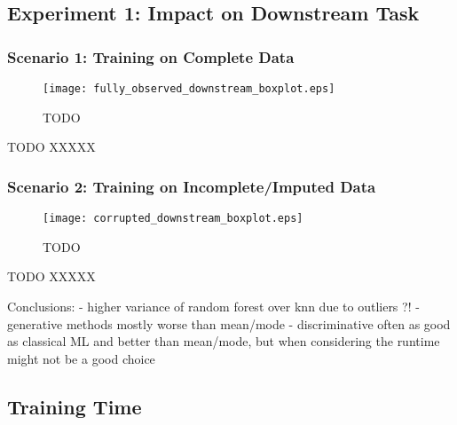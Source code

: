 \subsection{Experiment 1: Impact on Downstream Task}


\subsubsection{Scenario 1: Training on Complete Data}


\begin{figure}\centering
	\texttt{[image: fully\_observed\_downstream\_boxplot.eps]}

	\caption[TODO]{TODO}
	\label{fig:fully_observed_downstream_boxplot}
\end{figure}

TODO XXXXX


\subsubsection{Scenario 2: Training on Incomplete/Imputed Data}


\begin{figure}\centering
	\texttt{[image: corrupted\_downstream\_boxplot.eps]}

	\caption[TODO]{TODO}
	\label{fig:corrupted_downstream_boxplot}
\end{figure}

TODO XXXXX



Conclusions:
- higher variance of random forest over knn due to outliers ?!
- generative methods mostly worse than mean/mode
- discriminative often as good as classical ML and better than mean/mode, but when considering
the runtime might not be a good choice


\subsection{Training Time}

